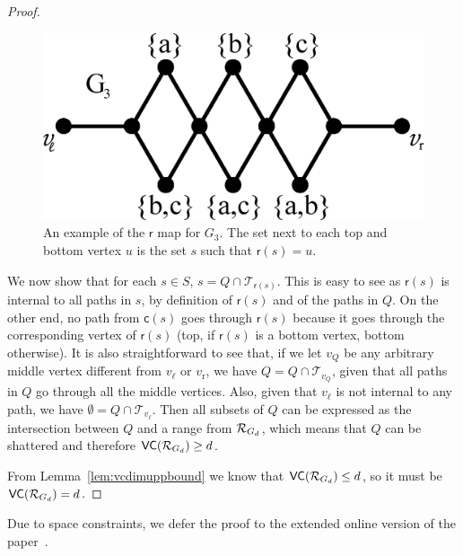 \begin{proof}
  \begin{figure}[ht]
    \centering
    \includegraphics[scale=0.4]{figures/eps/tight-mapexample}
    \caption{An example of the $\mathsf{r}$ map for $G_3$. The set next to
    each top and bottom vertex $u$ is the set $s$ such that $\mathsf{r}(s)=u$.}
    \label{fig:mapexample}
  \end{figure}
  
  We now show that for each $s\in S$, $s=Q\cap\mathcal{T}_{\mathsf{r}(s)}$. This
  is easy to see as $\mathsf{r}(s)$ is internal to all paths in $s$, by
  definition of $\mathsf{r}(s)$ and of the paths in $Q$. On the other end, no
  path from $\mathsf{c}(s)$ goes through $\mathsf{r}(s)$ because it goes through
  the corresponding vertex of $\mathsf{r}(s)$ (top, if $\mathsf{r}(s)$ is a
  bottom vertex, bottom otherwise). It is also straightforward to see that,
  if we let $v_Q$ be any arbitrary middle vertex different from $v_\ell$
  or $v_\mathrm{r}$, we have $Q=Q\cap\mathcal{T}_{v_Q}$, given that all paths in
  $Q$ go through all the middle vertices. Also, given that $v_\ell$ is not
  internal to any path, we have $\emptyset=Q\cap\mathcal{T}_{v_\ell}$. Then all
  subsets of $Q$ can be expressed as the intersection between $Q$ and a range
  from $\mathcal{R}_{G_d}$, which means that $Q$ can be shattered and therefore
  $\mathsf{VC}(\mathcal{R}_{G_d})\ge d$.

  From Lemma~\ref{lem:vcdimuppbound} we know that $\mathsf{VC}(\mathcal{R}_{G_d})\le d$, so
  it must be $\mathsf{VC}(\mathcal{R}_{G_d})=d$.
\end{proof}
\else
Due to space constraints, we defer the proof to the extended online version of
the paper~\citep{Anonymous13}.
\fi


